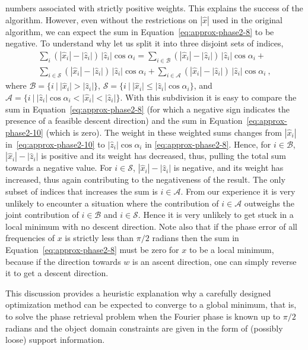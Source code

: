 numbers associated with strictly positive weights. This explains
the success of the algorithm. However, even without the
restrictions on $|\hat{x}|$ used in the original algorithm, we can
expect the sum in Equation~\eqref{eq:approx-phase2-8} to be negative.  To
understand why let 
us split it into three disjoint sets of indices,
\begin{multline}
  \label{eq:approx-phase2-11}
  \sum_{i} (|\hat{x}_{i}|
  -|\hat{z}_{i}|)\,|\hat{z}_{i}|\cos\alpha_{i} =
  \sum_{i\in\mathcal{B}}(|\hat{x}_{i}|
  -|\hat{z}_{i}|)\,|\hat{z}_{i}|\cos\alpha_{i} +\\
  \sum_{i\in\mathcal{S}}(|\hat{x}_{i}|
  -|\hat{z}_{i}|)\,|\hat{z}_{i}|\cos\alpha_{i} +
  \sum_{i\in\mathcal{A}}(|\hat{x}_{i}|
  -|\hat{z}_{i}|)\,|\hat{z}_{i}|\cos\alpha_{i}
  \ ,
\end{multline}
where $\mathcal{B} = \{i \ |\ |\hat{x}_{i}| > |\hat{z}_{i}|\}$,
$\mathcal{S} =\{i \ |\ |\hat{x}_{i}| \leq |\hat{z}_{i}|\cos\alpha_{i}\}$,
and $\mathcal{A} =\{i \ |\ |\hat{z}_{i}|\cos\alpha_{i} < |\hat{x}_{i}|
<|\hat{z}_{i}|\}$. With this subdivision it is easy to compare the sum
in Equation~\eqref{eq:approx-phase2-8} (for which a negative sign indicates
the presence of a
feasible descent direction) and the sum in Equation~\eqref{eq:approx-phase2-10}
(which is zero). The weight in these weighted sums 
changes from 
$|\hat{x}_{i}|$ in~\eqref{eq:approx-phase2-10} to $|\hat{z}_{i}|\cos\alpha_{i}$ in
\eqref{eq:approx-phase2-8}. Hence, for 
$i\in\mathcal B$, $|\hat{x}_{i}|-|\hat{z}_{i}|$ is positive and its
weight has decreased, thus, pulling the total sum towards a negative
value. For $i\in\mathcal S$, $|\hat{x}_{i}|-|\hat{z}_{i}|$ is
negative, and its weight has increased, thus again contributing to
the negativeness of the result. The only subset of indices that
increases the sum is $i\in\mathcal A$. From our experience it is very
unlikely to encounter a situation where the contribution of
$i\in\mathcal A$ outweighs the joint contribution of $i\in\mathcal B$
and $i\in\mathcal S$. Hence it is very unlikely to get stuck in a local
minimum with no descent direction. Note also that if the phase error
of all frequencies of $x$ is strictly less than $\pi/2$ radians then the
sum in Equation~\eqref{eq:approx-phase2-8} must be zero for $x$ to be a local
minimum,  because if the direction towards $w$ is an ascent direction,
one can simply reverse it to get a descent direction.

This discussion provides a heuristic explanation why a carefully designed
optimization method can be expected to converge to a  global
minimum, that is, to solve the phase retrieval problem when the Fourier
phase is known up to $\pi/2$ radians and the object domain constraints
are given in the form of (possibly loose) support information.

